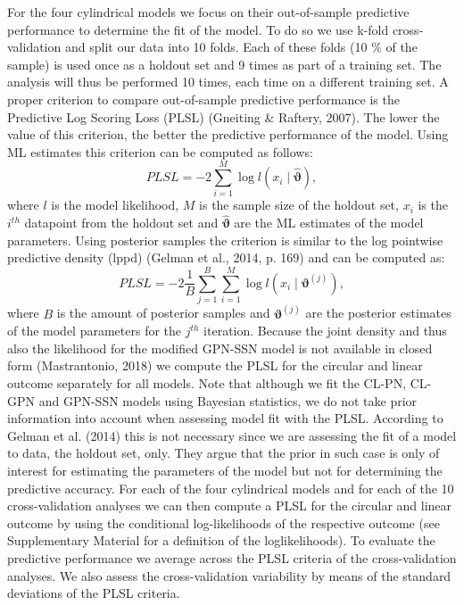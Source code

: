 \documentclass[man,mask]{apa6}
\begin{document}
For the four cylindrical models we focus on their out-of-sample predictive
performance to determine the fit of the model. To do so we use k-fold
cross-validation and split our data into 10 folds. Each of these folds (10 \(\%\)
of the sample) is used once as a holdout set and 9 times as part of a training
set. The analysis will thus be performed 10 times, each time on a different
training set.\newline
\indent A proper criterion to compare out-of-sample predictive performance is
the Predictive Log Scoring Loss (PLSL) (Gneiting \& Raftery, 2007). The lower the
value of this criterion, the better the predictive performance of the model.
Using ML estimates this criterion can be computed as follows:
\begin{equation}\label{PLSLML}
PLSL = -2 \sum_{i = 1}^{M}\log l(x_i \mid \hat{\boldsymbol{\vartheta}}),\nonumber
\end{equation}
\noindent where \(l\) is the model likelihood, \(M\) is the sample size of the
holdout set, \(x_i\) is the \(i^{th}\) datapoint from the holdout set and
\(\hat{\boldsymbol{\vartheta}}\) are the ML estimates of the model parameters.
Using posterior samples the criterion is similar to the log pointwise predictive
density (lppd) (Gelman et al., 2014, p. 169) and can be computed as:
\begin{equation}\label{PLSLBayes}
PLSL = -2 \frac{1}{B} \sum_{j = 1}^{B}\sum_{i = 1}^{M} \log l(x_i \mid \boldsymbol{\vartheta}^{(j)}),\nonumber
\end{equation}
\noindent where \(B\) is the amount of posterior samples and
\(\boldsymbol{\vartheta}^{(j)}\) are the posterior estimates of the model
parameters for the \(j^{th}\) iteration. Because the joint density and thus also
the likelihood for the modified GPN-SSN model is not
available in closed form (Mastrantonio, 2018) we compute the PLSL for the
circular and linear outcome separately for all models. Note that although we fit
the CL-PN, CL-GPN and GPN-SSN models using Bayesian statistics, we do not take
prior information into account when assessing model fit with the PLSL. According
to Gelman et al. (2014) this is not necessary since we are assessing the fit of a model
to data, the holdout set, only. They argue that the prior in such case is only
of interest for estimating the parameters of the model but not for determining
the predictive accuracy.\newline
\indent For each of the four cylindrical models and for each of the 10
cross-validation analyses we can then compute a PLSL for the circular and linear
outcome by using the conditional log-likelihoods of the respective outcome (see
Supplementary Material for a definition of the loglikelihoods). To evaluate the
predictive performance we average across the PLSL criteria of the
cross-validation analyses. We also assess the cross-validation variability by
means of the standard deviations of the PLSL criteria.
\end{document}
